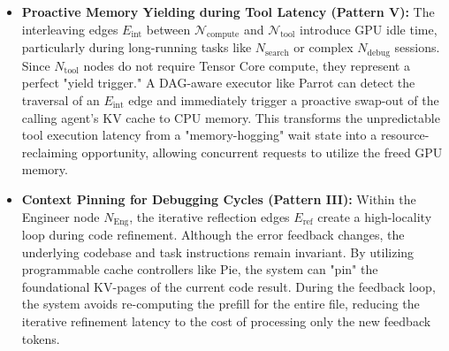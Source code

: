 \begin{itemize}
   \item \textbf{Proactive Memory Yielding during Tool Latency (Pattern V):} The interleaving edges $E_{\text{int}}$ between $\mathcal{N}_{\text{compute}}$ and $\mathcal{N}_{\text{tool}}$ introduce GPU idle time, particularly during long-running tasks like $N_{\text{search}}$ or complex $N_{\text{debug}}$ sessions. Since $N_{\text{tool}}$ nodes do not require Tensor Core compute, they represent a perfect "yield trigger." A DAG-aware executor like Parrot can detect the traversal of an $E_{\text{int}}$ edge and immediately trigger a proactive swap-out of the calling agent's KV cache to CPU memory. This transforms the unpredictable tool execution latency from a "memory-hogging" wait state into a resource-reclaiming opportunity, allowing concurrent requests to utilize the freed GPU memory.
   \item \textbf{Context Pinning for Debugging Cycles (Pattern III):} Within the Engineer node $N_{\text{Eng}}$, the iterative reflection edges $E_{\text{ref}}$ create a high-locality loop during code refinement. Although the error feedback changes, the underlying codebase and task instructions remain invariant. By utilizing programmable cache controllers like Pie, the system can "pin" the foundational KV-pages of the current code result. During the feedback loop, the system avoids re-computing the prefill for the entire file, reducing the iterative refinement latency to the cost of processing only the new feedback tokens.
\end{itemize}


